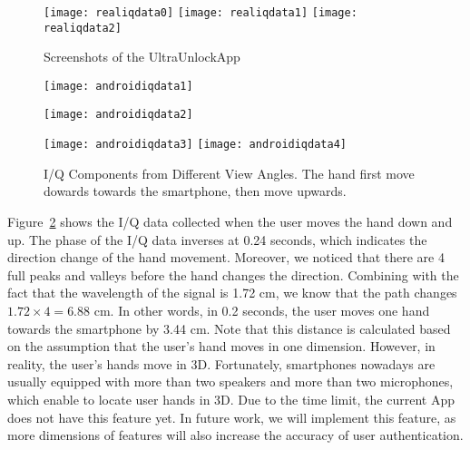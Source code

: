 \begin{figure}[h]
	\centering
	\begin{minipage}{.6\linewidth}
		\texttt{[image: realiqdata0]}
		\vspace{.1in}
		\texttt{[image: realiqdata1]}
		\vspace{.1in}
		\texttt{[image: realiqdata2]}
	\end{minipage}
	\caption{Screenshots of the UltraUnlockApp}	
	\label{fig:realIQ}
\end{figure}

\begin{figure}[!h]
	\centering
	\texttt{[image: androidiqdata1]}
	\begin{minipage}{.4\linewidth}
		\texttt{[image: androidiqdata2]}
	\end{minipage}
	\hfil
	\begin{minipage}{.5\linewidth}
		\texttt{[image: androidiqdata3]}
		\texttt{[image: androidiqdata4]}
	\end{minipage}
	\caption[I/Q Components Collected by UltraUnlockApp]{I/Q Components from Different View Angles. The hand first move dowards towards the smartphone, then move upwards.}
	\label{fig:androidiqdata}
\end{figure}

Figure~\ref{fig:androidiqdata} shows the I/Q data collected when the user moves the hand down and up. The phase of the I/Q data inverses at 0.24 seconds, which indicates the direction change of the hand movement. Moreover, we noticed that there are 4 full peaks and valleys before the hand changes the direction. Combining with the fact that the wavelength of the signal is 1.72 cm, we know that the path changes $1.72 \times 4 = 6.88$ cm. In other words, in 0.2 seconds, the user moves one hand towards the smartphone by 3.44 cm. Note that this distance is calculated based on the assumption that the user's hand moves in one dimension. However, in reality, the user's hands move in 3D. Fortunately, smartphones nowadays are usually equipped with more than two speakers and more than two microphones, which enable {\uu} to locate user hands in 3D. Due to the time limit, the current {\uu}App does not have this feature yet. In future work, we will implement this feature, as more dimensions of features will also increase the accuracy of user authentication.

